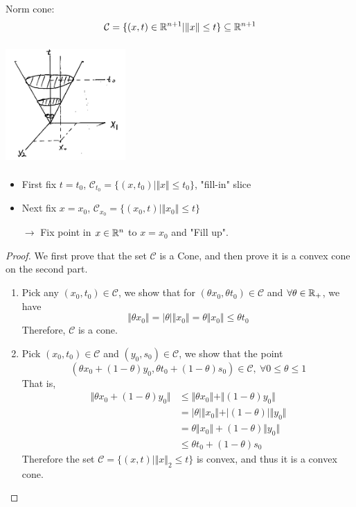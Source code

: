 Norm cone:
\begin{equation*}
\mathcal{C} = \{(x,t)\in \mathbb{R}^{n+ 1} \vert \Vert x\Vert \leq t \} \subseteq \mathbb{R}^{n+1}
\end{equation*}


\begin{marginfigure}
\centering
\includegraphics[width=1.8in,height=1.8in]{figures/ch09/figure1118_1.png}
\end{marginfigure}

\begin{itemize}
	\item First fix $t = t_0$, $\mathcal{C}_{t_0} = \{(x,t_0)\vert \Vert x\Vert \leq t_0 \}$, "fill-in" slice
	
	\item Next fix $x = x_0$, $\mathcal{C}_{x_0} = \{(x_0,t)\vert \Vert x_0\Vert \leq t \}$
	
	$\rightarrow$  Fix point in $x\in \mathbb{R}^n$ to $x = x_0$ and "Fill up".
\end{itemize}


\begin{proof}
	We first prove that the set $\mathcal{C}$ is a Cone, and then prove it is a convex cone on the second part.
	
	\begin{enumerate}
		\item Pick any $(x_0, t_0)\in \mathcal{C}$, we show that for $(\theta x_0, \theta t_0)\in \mathcal{C}$ and $\forall \theta \in \mathbb{R}_+$, we have
		$$\Vert \theta x_0\Vert = \vert \theta \vert \Vert x_0\Vert = \theta \Vert x_0\Vert \leq \theta t_0$$
		Therefore, $\mathcal{C}$ is a cone.
		
		\item Pick $(x_0, t_0)\in \mathcal{C}$ and $(y_0, s_0)\in \mathcal{C}$, we show that the point 
		$$(\theta x_0 + (1-\theta)y_0, \theta t_0 + (1-\theta)s_0)\in \mathcal{C},\ \forall 0\leq \theta \leq 1$$
		That is,
		\begin{align*}
		\Vert \theta x_0 + (1-\theta)y_0\Vert 
		&\leq \Vert \theta x_0\Vert + \Vert (1-\theta)y_0\Vert\\
		&= \vert \theta \vert \Vert x_0\Vert + \vert (1-\theta) \vert \Vert y_0\Vert\\
		&= \theta \Vert x_0\Vert +  (1-\theta)\Vert y_0\Vert\\
		&\leq \theta t_0 + (1-\theta)s_0
		\end{align*}
		Therefore the set $\mathcal{C} = \{(x,t)\vert \Vert x\Vert_2 \leq t \}$ is convex, and thus it is a convex cone.
		\end{enumerate}
		\end{proof}
		
